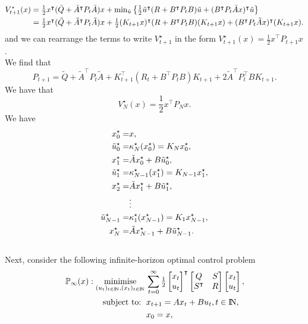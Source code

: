 \documentclass[a4paper,11pt,reqno]{amsart}
\newcommand{\N}{{\rm I\!N}}
\newcommand{\tran}{\intercal}
\DeclareMathOperator*{\minimise}{minimise}
\begin{document}
\begin{align}
    V_{t+1}^{\star}(x)&=\textstyle\frac{1}{2}x^{\tran}(\tilde{Q}+\tilde{A}^{\tran}P_t\tilde{A})x+\min_{\tilde{u}}\left\{\textstyle\frac{1}{2}\tilde{u}^{\tran}(R+B^{\tran}P_tB)\tilde{u}+(B^{\tran}P_t\tilde{A}x)^{\tran}\tilde{u}\right\}\notag\\
    &=\textstyle\frac{1}{2}x^{\tran}(\tilde{Q}+\tilde{A}^{\tran}P_t\tilde{A})x+\frac{1}{2}(K_{t+1}x)^{\tran}(R+B^{\tran}P_tB)(K_{t+1}x)+(B^{\tran}P_t\tilde{A}x)^{\tran}(K_{t+1}x).
\end{align}
and we can rearrange the terms to write $V_{t+1}^{\star}$ in the form $V_{t+1}^{\star}(x)=\textstyle\frac{1}{2}x^{\tran}P_{t+1}x$.\\
We find that
\begin{equation}
    P_{t+1}=\tilde{Q}+\tilde{A}^{\tran}P_t\tilde{A}+K_{t+1}^{\tran}(R_t+B^{\tran}P_tB)K_{t+1}+2\tilde{A}^{\tran}P_t^{\tran}BK_{t+1}.
\end{equation}
We have that
\begin{equation}
    V_{N}^{\star}(x)=\textstyle\frac{1}{2}x^{\tran}P_Nx.
\end{equation}
We have
\begin{align}
    x_0^{\star}=&x,\notag\\
    \tilde{u}_0^{\star}=&\kappa_N^{\star}(x_0^{\star})=K_Nx_0^{\star},\notag\\
    x_1^{\star}=&\tilde{A}x_0^{\star}+B\tilde{u}_0^{\star},\notag\\
    \tilde{u}_1^{\star}=&\kappa_{N-1}^{\star}(x_1^{\star})=K_{N-1}x_1^{\star},\notag\\
    x_2^{\star}=&\tilde{A}x_1^{\star}+B\tilde{u}_1^{\star},\notag\\
    &\vdots \notag\\
    \tilde{u}_{N-1}^{\star}=&\kappa_1^{\star}(x_{N-1}^{\star})=K_1x_{N-1}^{\star},\notag\\
    x_N^{\star}=&\tilde{A}x_{N-1}^{\star}+B\tilde{u}_{N-1}^{\star}.\notag
\end{align}
\
\\
Next, consider the following infinite-horizon optimal control problem
\begin{subequations}
    \begin{align}
        \mathbb{P}_{\infty}(x): \minimise_{(u_t)_{t\in \N},(x_t)_{t\in \N}} \,
        & \sum_{t=0}^{\infty}\textstyle\frac{1}{2}
        \begin{bmatrix}
            x_t\\
            u_t
        \end{bmatrix}^{\tran}
        \begin{bmatrix}
            Q&S\\
            S^{\tran}&R
        \end{bmatrix}
        \begin{bmatrix}
            x_t\\
            u_t
        \end{bmatrix},
        \\
        \text{subject to: }\,
        & x_{t+1} = A x_t + B u_t, t\in\N,
        \\
        & x_{0} = x,
    \end{align}
\end{subequations}
\end{document}
